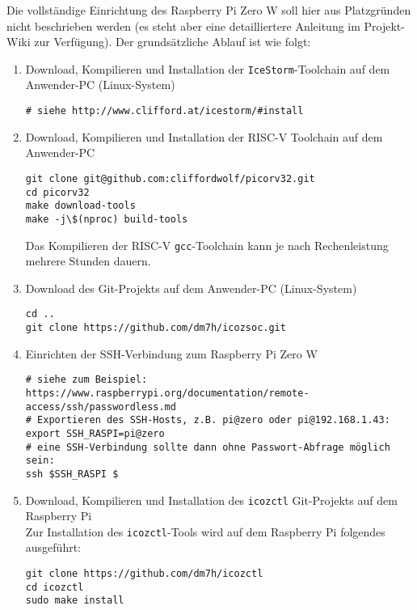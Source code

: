 Die vollständige Einrichtung des Raspberry Pi Zero W soll hier aus Platzgründen nicht beschrieben werden (es steht aber eine detailliertere Anleitung im Projekt-Wiki zur Verfügung).
Der grundsätzliche Ablauf ist wie folgt:
\begin{enumerate}

\item Download, Kompilieren und Installation der {\tt IceStorm}-Toolchain auf dem Anwender-PC (Linux-System)

\begin{verbatim}
# siehe http://www.clifford.at/icestorm/#install
\end{verbatim}

\item Download, Kompilieren und Installation der RISC-V Toolchain auf dem Anwender-PC

\begin{verbatim}
git clone git@github.com:cliffordwolf/picorv32.git
cd picorv32
make download-tools
make -j\$(nproc) build-tools
\end{verbatim}

Das Kompilieren der RISC-V {\tt gcc}-Toolchain kann je nach Rechenleistung mehrere Stunden dauern.

\item Download des Git-Projekts auf dem Anwender-PC (Linux-System)

\begin{verbatim}
cd ..
git clone https://github.com/dm7h/icozsoc.git
\end{verbatim}


\item Einrichten der SSH-Verbindung zum Raspberry Pi Zero W 

\begin{verbatim}
# siehe zum Beispiel: https://www.raspberrypi.org/documentation/remote-access/ssh/passwordless.md
# Exportieren des SSH-Hosts, z.B. pi@zero oder pi@192.168.1.43:
export SSH_RASPI=pi@zero
# eine SSH-Verbindung sollte dann ohne Passwort-Abfrage möglich sein:
ssh $SSH_RASPI $
\end{verbatim}

\item Download, Kompilieren und Installation des {\tt icozctl} Git-Projekts auf dem Raspberry Pi\\ 
Zur Installation des {\tt icozctl}-Tools wird auf dem Raspberry Pi folgendes ausgeführt:
\begin{verbatim}
git clone https://github.com/dm7h/icozctl
cd icozctl
sudo make install
\end{verbatim}


\end{enumerate}
